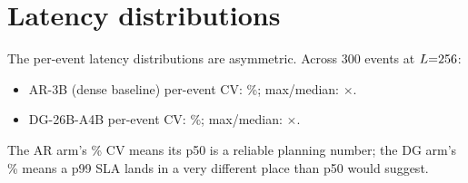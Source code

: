 \section{Latency distributions}
\label{app:distributions}

The per-event latency distributions are asymmetric. Across 300 events at
$L{=}256$:
\begin{itemize}[nosep]
\item AR-3B (dense baseline) per-event CV: \arEventCV\%; max/median: \arMaxMed$\times$.
\item DG-26B-A4B per-event CV: \dgEventCV\%; max/median: \dgMaxMed$\times$.
\end{itemize}
The AR arm's \arEventCV\% CV means its p50 is a reliable planning number;
the DG arm's \dgEventCV\% means a p99 SLA lands in a very different
place than p50 would suggest.
